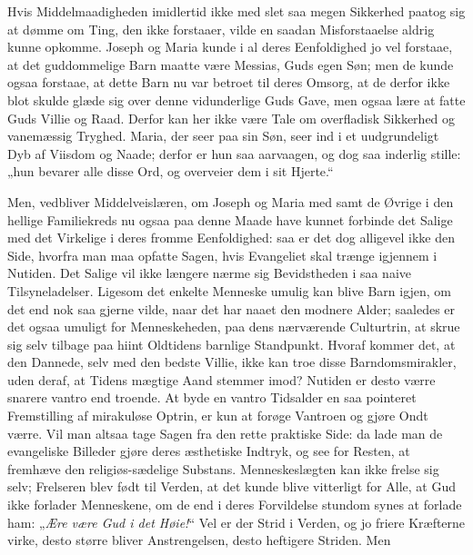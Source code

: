 \documentclass[12pt,a4paper]{book}
\begin{document}
Hvis Middelmaadigheden imidlertid ikke med slet saa megen Sikkerhed paatog sig at
dømme om Ting, den ikke forstaaer, vilde en saadan Misforstaaelse aldrig kunne
opkomme. Joseph og Maria kunde i al deres Eenfoldighed jo vel forstaae, at det
guddommelige Barn maatte være Messias, Guds egen Søn; men de kunde ogsaa forstaae, at
dette Barn nu var betroet til deres Omsorg, at de derfor ikke blot skulde glæde sig
over denne vidunderlige Guds Gave, men ogsaa lære at fatte Guds Villie og Raad. Derfor
kan her ikke være Tale om overfladisk Sikkerhed og vanemæssig Tryghed. Maria, der seer
paa sin Søn, seer ind i et uudgrundeligt Dyb af Viisdom og Naade; derfor er hun saa
aarvaagen, og dog saa inderlig stille: „hun bevarer alle disse Ord, og overveier dem i
sit Hjerte.“

Men, vedbliver Middelveislæren, om Joseph og Maria med samt de Øvrige i den
hellige Familiekreds nu ogsaa paa denne Maade have kunnet forbinde det Salige
med det Virkelige i deres fromme Eenfoldighed: saa er det dog alligevel ikke den
Side, hvorfra man maa opfatte Sagen, hvis Evangeliet skal trænge igjennem i
Nutiden. Det Salige vil ikke længere nærme sig Bevidstheden i saa naive
Tilsyneladelser. Ligesom det enkelte Menneske umulig kan blive Barn igjen, om det
end nok saa gjerne vilde, naar det har naaet den modnere Alder; saaledes er det
ogsaa umuligt for Menneskeheden, paa dens nærværende Culturtrin, at skrue sig
selv tilbage paa hiint Oldtidens barnlige Standpunkt. Hvoraf kommer det, at den
Dannede, selv med den bedste Villie, ikke kan troe disse Barndomsmirakler, uden
deraf, at Tidens mægtige Aand stemmer imod? Nutiden er desto værre snarere vantro
end troende. At byde en vantro Tidsalder en saa pointeret Fremstilling af
mirakuløse Optrin, er kun at forøge Vantroen og gjøre Ondt værre. Vil man altsaa
tage Sagen fra den rette praktiske Side: da lade man de evangeliske Billeder
gjøre deres æsthetiske Indtryk, og see for Resten, at fremhæve den
religiøs-sædelige Substans. Menneskeslægten kan ikke frelse sig selv; Frelseren
blev født til Verden, at det kunde blive vitterligt for Alle, at Gud ikke
forlader Menneskene, om de end i deres Forvildelse stundom synes at forlade ham:
„\emph{Ære være Gud i det Høie!}“ Vel er der Strid i Verden, og jo friere
Kræfterne virke, desto større bliver Anstrengelsen, desto heftigere Striden. Men
\end{document}
